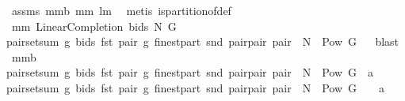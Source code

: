 \begin{isabellebody}
\ assms\ mm{}{}b\ mm{}{}\ lm{}{}\ \isamarkupfalse%
\ {\isacharparenleft}metis\ is{\isacharunderscore}partition{\isacharunderscore}of{\isacharunderscore}def{\isacharparenright}%
\endisatagproof
{\isafoldproof}%
%
\isadelimproof
%
\endisadelimproof
\isanewline
\isanewline
\isanewline
\isanewline
\isanewline
\isanewline
\isanewline
\isanewline
\isanewline
\isanewline
\isanewline
\isanewline
\isanewline
\isanewline
\isanewline
\isanewline
\isanewline
\isanewline
\isanewline
\isanewline
\isanewline
\isanewline
\isanewline
\isanewline
\isanewline
{}\isamarkupfalse%
\ mm{}{}{\isacharcolon}\ {\isachardoublequoteopen}LinearCompletion\ bids\ N\ G\ {\isacharequal}\ \isanewline
{\isacharbraceleft}{\isacharparenleft}pair{\isacharcomma}setsum\ {\isacharparenleft}{\isacharpercent}g{\isachardot}\ bids\ {\isacharparenleft}fst\ pair{\isacharcomma}\ g{\isacharparenright}{\isacharparenright}\ {\isacharparenleft}finestpart\ {\isacharparenleft}snd\ pair{\isacharparenright}{\isacharparenright}{\isacharparenright}{\isacharbar}pair{\isachardot}\ pair\ {\isasymin}\ N\ {\isasymtimes}\ {\isacharparenleft}Pow\ G{\isacharminus}{\isacharbraceleft}{\isacharbraceleft}{\isacharbraceright}{\isacharbraceright}{\isacharparenright}{\isacharbraceright}{\isachardoublequoteclose}%
\isadelimproof
\ %
\endisadelimproof
%
\isatagproof
{}\isamarkupfalse%
\ blast%
\endisatagproof
{\isafoldproof}%
%
\isadelimproof
%
\endisadelimproof
\isanewline
{}\isamarkupfalse%
\ mm{}{}b{\isacharcolon}\ \isanewline
{\isachardoublequoteopen}{\isacharbraceleft}{\isacharparenleft}pair{\isacharcomma}setsum\ {\isacharparenleft}{\isacharpercent}g{\isachardot}\ bids\ {\isacharparenleft}fst\ pair{\isacharcomma}\ g{\isacharparenright}{\isacharparenright}\ {\isacharparenleft}finestpart\ {\isacharparenleft}snd\ pair{\isacharparenright}{\isacharparenright}{\isacharparenright}{\isacharbar}pair{\isachardot}\ pair\ {\isasymin}\ N\ {\isasymtimes}\ {\isacharparenleft}Pow\ G{\isacharminus}{\isacharbraceleft}{\isacharbraceleft}{\isacharbraceright}{\isacharbraceright}{\isacharparenright}{\isacharbraceright}\ {\isacharbar}{\isacharbar}\ a\ {\isacharequal}\ \isanewline
{\isacharbraceleft}{\isacharparenleft}pair{\isacharcomma}setsum\ {\isacharparenleft}{\isacharpercent}g{\isachardot}\ bids\ {\isacharparenleft}fst\ pair{\isacharcomma}\ g{\isacharparenright}{\isacharparenright}\ {\isacharparenleft}finestpart\ {\isacharparenleft}snd\ pair{\isacharparenright}{\isacharparenright}{\isacharparenright}{\isacharbar}pair{\isachardot}\ pair\ {\isasymin}\ {\isacharparenleft}N\ {\isasymtimes}\ {\isacharparenleft}Pow\ G\ {\isacharminus}\ {\isacharbraceleft}{\isacharbraceleft}{\isacharbraceright}{\isacharbraceright}{\isacharparenright}{\isacharparenright}\ {\isasyminter}\ a{\isacharbraceright}{\isachardoublequoteclose}\isanewline

\end{isabellebody}
